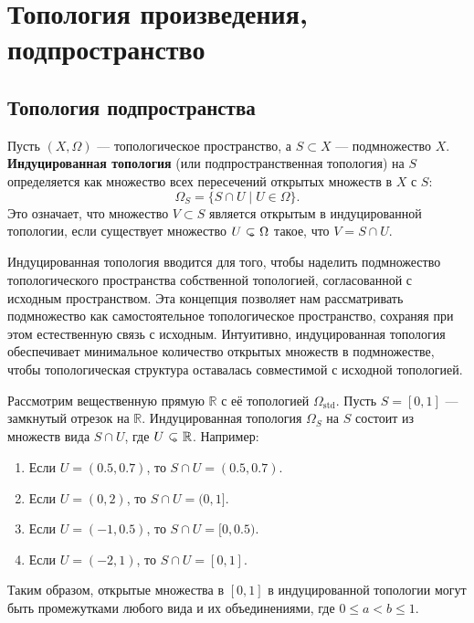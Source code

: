 \section{Топология произведения, подпространство}
\subsection{Топология подпространства}

\begin{definition}
	Пусть \((X, \Omega)\) — топологическое пространство, а \(S \subset X\) — подмножество \(X\). \textbf{Индуцированная топология} (или подпространственная топология) на \(S\) определяется как множество всех пересечений открытых множеств в \(X\) с \(S\):
\[
\Omega_S = \{ S \cap U \mid U \in \Omega \}.
\]
Это означает, что множество \(V \subset S\) является открытым в индуцированной топологии, если существует множество \(U \open \Omega\) такое, что \(V = S \cap U\).
\end{definition}

Индуцированная топология вводится для того, чтобы наделить подмножество топологического пространства собственной топологией, согласованной с исходным пространством. Эта концепция позволяет нам рассматривать подмножество как самостоятельное топологическое пространство, сохраняя при этом естественную связь с исходным. Интуитивно, индуцированная топология обеспечивает минимальное количество открытых множеств в подмножестве, чтобы топологическая структура оставалась совместимой с исходной топологией.

\begin{example}
	Рассмотрим вещественную прямую \(\mathbb{R}\) с её топологией \(\Omega_{\text{std}}\). Пусть \(S = [0, 1]\) — замкнутый отрезок на \(\mathbb{R}\). Индуцированная топология \(\Omega_S\) на \(S\) состоит из множеств вида \(S \cap U\), где \(U \open \mathbb{R}\). Например:
	\begin{enumerate}
		\item Если \(U = (0.5, 0.7)\), то \(S \cap U = (0.5, 0.7)\).
		\item Если \(U = (0, 2)\), то \(S \cap U = (0, 1]\).
		\item Если \(U = (-1, 0.5)\), то \(S \cap U = [0, 0.5)\).
		\item Если \(U = (-2, 1)\), то \(S \cap U = [0, 1]\).
	\end{enumerate}
	
Таким образом, открытые множества в \([0, 1]\) в индуцированной топологии могут быть промежутками любого вида и их объединениями, где \(0 \leq a < b \leq 1\).

\end{example}

